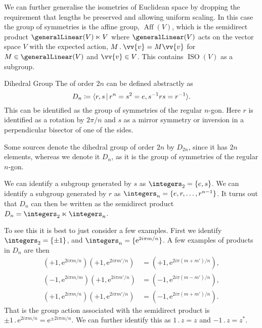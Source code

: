 \documentclass[fleqn]{NotesClass}
\newcommand*{\action}{\mathbin{.}}
\newcommand*{\e}{\mathrm{e}}
\DeclareMathOperator{\ISO}{ISO}
\begin{document}
    We can further generalise the isometries of Euclidean space by dropping the requirement that lengths be preserved and allowing uniform scaling.
    In this case the group of symmetries is the affine group, \(\mathop{\mathrm{Aff}}(V)\), which is the semidirect product \(\generalLinear(V) \ltimes V\) where \(\generalLinear(V)\) acts on the vector space \(V\) with the expected action, \(M\action \vv{v} = M\vv{v}\) for \(M\in\generalLinear(V)\) and \(\vv{v} \in V\).
    This contains \(\ISO(V)\) as a subgroup.
    
    \begin{exm}{Dihedral Group}{}
        The  of order \(2n\) can be defined abstractly as
        \begin{equation}
            D_n \coloneqq \presentation{r, s}{r^n = s^2 = e, s^{-1}rs = r^{-1}}.
        \end{equation}
        This can be identified as the group of symmetries of the regular \(n\)-gon.
        Here \(r\) is identified as a rotation by \(2\pi/n\) and \(s\) as a mirror symmetry or inversion in a perpendicular bisector of one of the sides.
        
        \begin{wrn}
            Some sources denote the dihedral group of order \(2n\) by \(D_{2n}\), since it has \(2n\) elements, whereas we denote it \(D_{n}\), as it is the group of symmetries of the regular \(n\)-gon.
        \end{wrn}
        
        We can identify a subgroup generated by \(s\) as \(\integers_2 = \{e, s\}\).
        We can identify a subgroup generated by \(r\) as \(\integers_n = \{e, r, \dotsc, r^{n-1}\}\).
        It turns out that \(D_n\) can then be written as the semidirect product \(D_n = \integers_2 \ltimes \integers_n\).
        
        To see this it is best to just consider a few examples.
        First we identify \(\integers_2 = \{\pm 1\}\), and \(\integers_n = \{\e^{2i\pi m/n}\}\).
        A few examples of products in \(D_n\) are then
        \begin{align}
            (+1, \e^{2i\pi m/n})(+1, \e^{2i\pi m'/n}) &= (+1, \e^{2i\pi(m + m')/n}),\\
            (-1, \e^{2i\pi m/m})(+1, \e^{2i\pi m'/n}) &= (-1, \e^{2i\pi(m - m')/n}),\\
            (+1, \e^{2i\pi m/n})(+1, \e^{2i\pi m'/n}) &= (-1, \e^{2i\pi(m + m')/n}).
        \end{align}
        That is the group action associated with the semidirect product is \(\pm 1 \action \e^{2i\pi m/n} = \e^{\pm 2i\pi m/n}\).
        We can further identify this as \(1\action z = z\) and \(-1\action z = z^*\).
    \end{exm}
    
\end{document}
